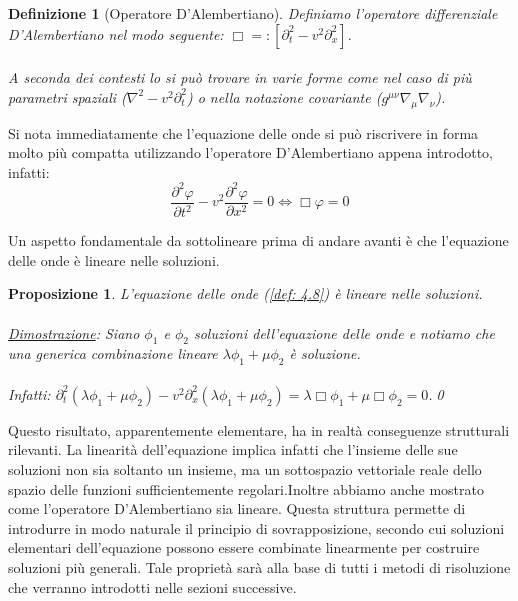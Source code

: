 \documentclass[a4paper,12pt]{report}
\newtheorem{definizione}{Definizione}[chapter]
\newtheorem{proposizione}{Proposizione}[chapter]
\newcommand{\pdd}[2]{\frac{\partial^2 #1}{\partial #2^2}}
\begin{document}
\begin{definizione}[Operatore D'Alembertiano]
    Definiamo l'operatore differenziale D'Alembertiano nel modo seguente: $\Box=:[\partial_t^2-v^2\partial_x^2]$.
    \\
    \\A seconda dei contesti lo si può trovare in varie forme come nel caso di più parametri spaziali ($\nabla^2-v^2\partial_t^2$) o nella notazione covariante ($g^{\mu\nu}\nabla_\mu\nabla_\nu$).
\end{definizione}

Si nota immediatamente che l'equazione delle onde si può riscrivere in forma molto più compatta utilizzando l'operatore D'Alembertiano appena introdotto, infatti:
\[\displaystyle\pdd{\varphi}{t}-v^2\pdd{\varphi}{x}=0\iff \Box\varphi=0\]

\newpage

Un aspetto fondamentale da sottolineare prima di andare avanti è che l'equazione delle onde è lineare nelle soluzioni.

\begin{proposizione}\label{prop: 4.1}
    L'equazione delle onde (\ref{def: 4.8}) è lineare nelle soluzioni.
    \\
    \\\underline{Dimostrazione}: Siano $\phi_1$ e $\phi_2$ soluzioni dell'equazione delle onde e notiamo che una generica combinazione lineare $\lambda\phi_1+\mu\phi_2$ è soluzione.\\
    \\ Infatti: $\partial_t^2(\lambda\phi_1+\mu\phi_2)-v^2\partial_x^2(\lambda\phi_1+\mu\phi_2)=\lambda\Box\phi_1+\mu\Box\phi_2=0$.\qed
\end{proposizione}

Questo risultato, apparentemente elementare, ha in realtà conseguenze strutturali rilevanti. La linearità dell’equazione implica infatti che l’insieme delle sue soluzioni non sia soltanto un insieme, ma un sottospazio vettoriale reale dello spazio delle funzioni sufficientemente regolari.Inoltre abbiamo anche mostrato come l'operatore D'Alembertiano sia lineare. Questa struttura permette di introdurre in modo naturale il principio di sovrapposizione, secondo cui soluzioni elementari dell’equazione possono essere combinate linearmente per costruire soluzioni più generali. Tale proprietà sarà alla base di tutti i metodi di risoluzione che verranno introdotti nelle sezioni successive.
\end{document}
